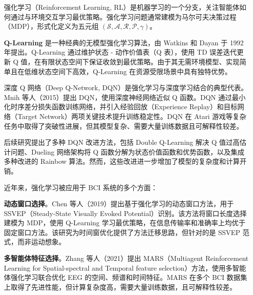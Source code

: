 \label{sec:rl_in_bci}

\label{subsec:rl_basics}

强化学习（Reinforcement Learning, RL）是机器学习的一个分支，关注智能体如何通过与环境交互学习最优策略\cite{sutton2018reinforcement}。强化学习问题通常建模为马尔可夫决策过程（MDP），形式化定义为五元组 $(\mathcal{S}, \mathcal{A}, \mathcal{R}, \mathcal{P}, \gamma)$。

\textbf{Q-Learning} 是一种经典的无模型强化学习算法，由 Watkins 和 Dayan 于 1992 年提出\cite{watkins1992q}。Q-Learning 通过维护状态 - 动作价值表（Q 表），使用 TD 误差迭代更新 Q 值，在有限状态空间下保证收敛到最优策略。由于其无需环境模型、实现简单且在低维状态空间下高效，Q-Learning 在资源受限场景中具有独特优势。

\label{subsec:deep_q_network}

深度 Q 网络（Deep Q-Network, DQN）是强化学习与深度学习结合的典型代表。Mnih 等人（2015）提出 DQN，使用深度神经网络近似 Q 函数\cite{mnih2015human}。DQN 通过最小化时序差分损失函数训练网络，并引入经验回放（Experience Replay）和目标网络（Target Network）两项关键技术提升训练稳定性。DQN 在 Atari 游戏等复杂任务中取得了突破性进展，但其模型复杂、需要大量训练数据且可解释性较差。

后续研究提出了多种 DQN 改进方法，包括 Double Q-Learning 解决 Q 值过高估计问题\cite{van2016deep}、Dueling 网络架构将 Q 函数分解为状态价值函数和优势函数\cite{wang2016dueling}，以及集成多种改进的 Rainbow 算法\cite{hessel2018rainbow}。然而，这些改进进一步增加了模型的复杂度和计算开销。

\label{subsec:rl_bci_applications}

近年来，强化学习被应用于 BCI 系统的多个方面\cite{zhang2021mars}：

\textbf{动态窗口选择}。Chen 等人（2019）提出基于强化学习的动态窗口方法，用于 SSVEP（Steady-State Visually Evoked Potential）识别\cite{chen2019dynamic}。该方法将窗口长度选择建模为 MDP，使用 Q-Learning 学习最优策略，在信息传输率和准确率上均优于固定窗口方法。该研究为时间窗优化提供了方法迁移思路，但针对的是 SSVEP 范式，而非运动想象。

\textbf{多智能体特征选择}。Zhang 等人（2021）提出 MARS（Multiagent Reinforcement Learning for Spatial-spectral and Temporal feature selection）方法，使用多智能体强化学习联合优化 EEG 的空间、频谱和时间特征\cite{zhang2021mars}。MARS 在多个 BCI 数据集上取得了先进性能，但计算复杂度高，需要大量训练数据，且可解释性较差。

